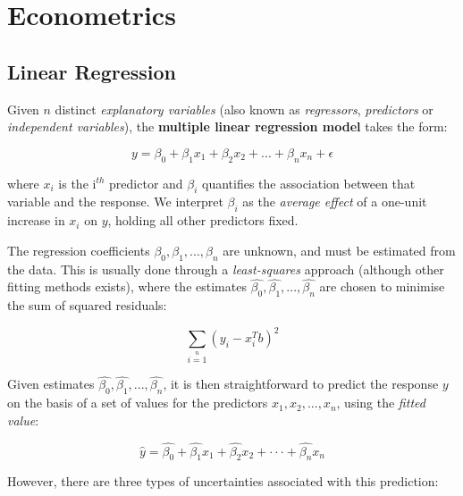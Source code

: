 \section{Econometrics}


\subsection{Linear Regression}
Given $n$ distinct \textit{explanatory variables} (also known as \textit{regressors}, \textit{predictors} or \textit{independent variables}), the \textbf{multiple linear regression model} takes the form:

\begin{equation}
    y = \beta_0 + \beta_1 x_1 + \beta_2 x_2 + ... + \beta_n x_n + \epsilon
\end{equation}

where $x_i$ is the i$^{th}$ predictor and $\beta_i$ quantifies the association between that variable and the response. We interpret $\beta_i$ as the \textit{average effect} of a one-unit increase in $x_i$ on $y$, holding all other predictors fixed.

The regression coefficients $\beta_0, \beta_1, ..., \beta_n$ are unknown, and must be estimated from the data. This is usually done through a \textit{least-squares} approach (although other fitting methods exists), where the estimates $\hat{\beta_0}, \hat{\beta_1}, ..., \hat{\beta_n}$ are chosen to minimise the sum of squared residuals:

\begin{equation}
    \sum\limits_{i=1}\limits^n (y_i - x_i ^T b)^2
\end{equation}

Given estimates $\hat{\beta_0}, \hat{\beta_1}, ..., \hat{\beta_n}$, it is then straightforward to predict the response $y$ on the basis of a set of values for the predictors $x_1, x_2, ..., x_n$, using the \textit{fitted value}:

\begin{equation}
    \hat{y} = \hat{\beta_0} + \hat{\beta_1} x_1 + \hat{\beta_2} x_2 + ··· + \hat{\beta_n} x_n
\end{equation}

However, there are three types of uncertainties associated with this prediction:


